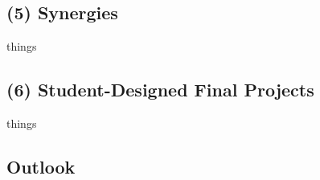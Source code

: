 \documentclass[../../../main.tex]{subfiles}
\begin{document}
\subsection{(5) Synergies}
things
\subsection{(6) Student-Designed Final Projects}
things
\subsection{Outlook}

\end{document}
